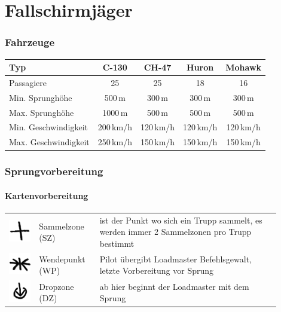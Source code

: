 \pagebreak
\chapter{Fallschirmjäger}

\subsection{Fahrzeuge}
\begin{longtable}{lcccc} 
	\toprule
	Typ & C-130 & CH-47 &	Huron	&	Mohawk \\ 
	\midrule
	Passagiere 	&	25 	&	25 	&	18 	&	16 \\ 
	Min. Sprunghöhe	& 500\,m 	& 300\,m 	&	300\,m	&	300\,m	\\
	Max. Sprunghöhe	&	1000\,m 	&	500\,m 	&	500\,m	&	500\,m \\
	Min. Geschwindigkeit	& 	200\,km/h	&	120\,km/h	&	120\,km/h	&	120\,km/h	\\ 
	Max. Geschwindigkeit	& 	250\,km/h	&	150\,km/h &	150\,km/h &	150\,km/h \\
	\bottomrule 
\end{longtable}

\subsection{Sprungvorbereitung}
\subsubsection*{Kartenvorbereitung}
\begin{tabular}{C{0.1\linewidth}m{0.2\linewidth} m{0.6\linewidth}}
	\includegraphics[scale=0.8]{../img/advanced/fallschirmspringen/sammelzone}	& Sammelzone (SZ)	& ist der Punkt wo sich ein Trupp sammelt, es werden immer 2 Sammelzonen pro Trupp bestimmt\\
	\includegraphics[scale=0.8]{../img/advanced/fallschirmspringen/wendepunkt} 	& Wendepunkt (WP) & Pilot übergibt Loadmaster Befehlsgewalt, letzte Vorbereitung vor Sprung\\
	\includegraphics[scale=0.8]{../img/advanced/fallschirmspringen/dropzone}	& Dropzone (DZ) & ab hier beginnt der Loadmaster mit dem Sprung
\end{tabular}

